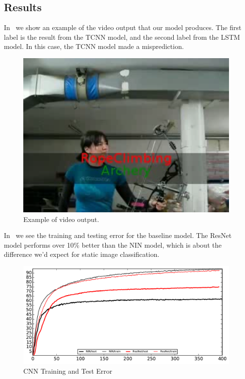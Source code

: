 \subsection{Results}
In~ we show an example of the video output that our model produces. The first label is the result from the TCNN model, and the second label from the LSTM model. In this case, the TCNN model made a misprediction. 
\begin{figure}
  \centering
  \includegraphics[width=0.8\linewidth]{figs/demo}
  \caption{Example of video output.}
  \label{fig:demo}
\end{figure}

In~ we see the training and testing error for the baseline model. The ResNet model performs over 10\% better than the NIN model, which is about the difference we'd expect for static image classification. 
\begin{figure}
  \centering
  \includegraphics[width=1.0\linewidth]{figs/CNNout}
  \caption{CNN Training and Test Error}
  \label{fig:cnntest}
\end{figure}

